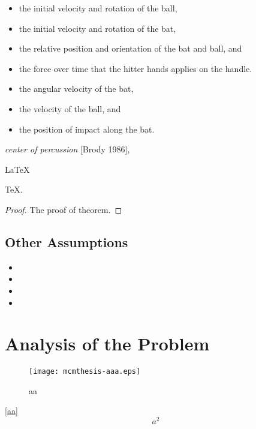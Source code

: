 \documentclass{mcmthesis}
\begin{document}
\begin{itemize}
\item the initial velocity and rotation of the ball,
\item the initial velocity and rotation of the bat,
\item the relative position and orientation of the bat and ball, and
\item the force over time that the hitter hands applies on the handle.
\end{itemize}

\begin{itemize}
\item the angular velocity of the bat,
\item the velocity of the ball, and
\item the position of impact along the bat.
\end{itemize}

\emph{center of percussion} [Brody 1986], 

\begin{Theorem} \label{thm:latex} %
\LaTeX
\end{Theorem}
\begin{Lemma} \label{thm:tex}  %
\TeX .
\end{Lemma}
\begin{proof}
The proof of theorem.
\end{proof}

\subsection{Other Assumptions}  %

\begin{itemize}
\item
\item
\item
\item
\end{itemize}


\section{Analysis of the Problem}
\begin{figure}[h]
\small
\centering
\texttt{[image: mcmthesis-aaa.eps]}
\caption{aa} \label{fig:aa}
\end{figure}

\eqref{aa}
\begin{equation}
a^2 \label{aa}
\end{equation}
\end{document}
